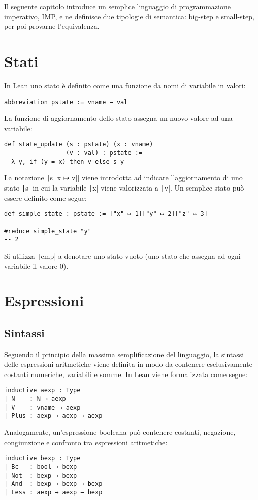 Il seguente capitolo introduce un semplice linguaggio di programmazione imperativo, IMP, e ne definisce due tipologie di semantica: big-step e small-step, per poi provarne l'equivalenza.

\section{Stati}
In Lean uno stato è definito come una funzione da nomi di variabile in valori:
\begin{verbatim}
abbreviation pstate := vname → val
\end{verbatim}
La funzione di aggiornamento dello stato assegna un nuovo valore ad una variabile:
\begin{verbatim}
def state_update (s : pstate) (x : vname) 
                 (v : val) : pstate :=
  λ y, if (y = x) then v else s y
\end{verbatim}
La notazione \texttt|s [x  ↦ v]| viene introdotta ad indicare l'aggiornamento di uno stato \texttt|s| in cui la variabile \texttt|x| viene valorizzata a \texttt|v|.
Un semplice stato può essere definito come segue:
\begin{verbatim}
def simple_state : pstate := ["x" ↦ 1]["y" ↦ 2]["z" ↦ 3]

#reduce simple_state "y"
-- 2
\end{verbatim}
Si utilizza \texttt|emp| a denotare uno stato vuoto (uno stato che assegna ad ogni variabile il valore 0).

\section{Espressioni}
\subsection{Sintassi}
Seguendo il principio della massima semplificazione del linguaggio, la sintassi delle espressioni aritmetiche viene definita in modo da contenere esclusivamente costanti numeriche, variabili e somme. In Lean viene formalizzata come segue:
\begin{verbatim}
inductive aexp : Type
| N    : ℕ → aexp
| V    : vname → aexp
| Plus : aexp → aexp → aexp
\end{verbatim}
Analogamente, un'espressione booleana può contenere costanti, negazione, congiunzione e confronto tra espressioni aritmetiche:
\begin{verbatim}
inductive bexp : Type
| Bc   : bool → bexp
| Not  : bexp → bexp
| And  : bexp → bexp → bexp
| Less : aexp → aexp → bexp
\end{verbatim}


